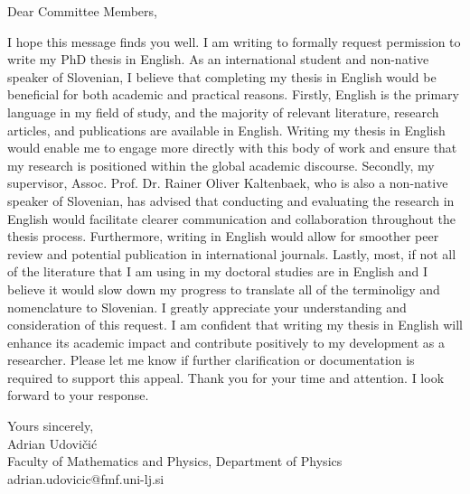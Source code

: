 \documentclass{article}
\theoremstyle{mytheoremstyle}
\theoremstyle{mytheoremstyle}
\theoremstyle{myproblemstyle}
\begin{document}
\vspace{1cm} %
Dear Committee Members,
\vspace{1cm}

I hope this message finds you well. I am writing to formally request permission to write my PhD thesis in English.
As an international student and non-native speaker of Slovenian, I believe that completing my thesis in English would be beneficial for both academic and practical reasons.
Firstly, English is the primary language in my field of study, and the majority of relevant literature, research articles, and publications are available in English.
Writing my thesis in English would enable me to engage more directly with this body of work and ensure that my research is positioned within the global academic discourse.
Secondly, my supervisor, Assoc. Prof. Dr. Rainer Oliver Kaltenbaek, who is also a non-native speaker of Slovenian, has advised that conducting and evaluating the research in
English would facilitate clearer communication and collaboration throughout the thesis process. Furthermore, writing in English would allow for smoother peer review
and potential publication in international journals.
Lastly, most, if not all of the literature that I am using in my doctoral studies are in English and I believe it would slow down my progress to translate
all of the terminoligy and nomenclature to Slovenian.
I greatly appreciate your understanding and consideration of this request. I am confident that writing my thesis in English will enhance its academic
impact and contribute positively to my development as a researcher. Please let me know if further clarification or documentation is required to support this appeal.
Thank you for your time and attention. I look forward to your response.

\vspace{1cm}
Yours sincerely,\\
Adrian Udovičić\\
Faculty of Mathematics and Physics, Department of Physics\\
adrian.udovicic@fmf.uni-lj.si




\clearpage
\pagestyle{plain}
\end{document}
